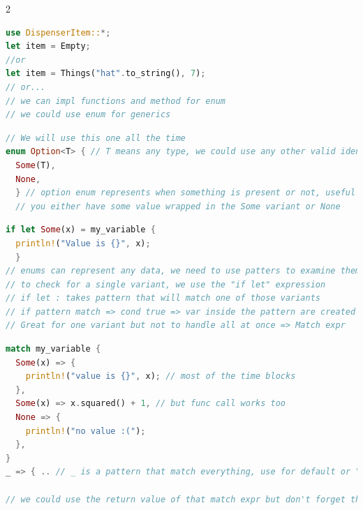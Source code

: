 \documentclass{report}
\begin{document}
\begin{multicols*}{2}
\begin{tcolorbox}[colback=backcolour,size=small,left=4mm]
\begin{lstlisting}[language=rust]
use DispenserItem::*;
let item = Empty;
//or 
let item = Things("hat".to_string(), 7);
// or...
// we can impl functions and method for enum
// we could use enum for generics
\end{lstlisting}
\end{tcolorbox}

\begin{tcolorbox}[title=Option Enum (Std),colback=backcolour,size=small,left=4mm]
\begin{lstlisting}[language=rust]
// We will use this one all the time
enum Option<T> { // T means any type, we could use any other valid identifier, but the idiomatic thing in rust is to use T or other CAP letter
  Some(T),
  None,
  } // option enum represents when something is present or not, useful when we want to reach of null or nil
  // you either have some value wrapped in the Some variant or None
\end{lstlisting}
\end{tcolorbox}

\begin{tcolorbox}[title=Examples,colback=backcolour,size=small,left=4mm]
\begin{lstlisting}[language=rust]
if let Some(x) = my_variable {
  println!("Value is {}", x);
  }
// enums can represent any data, we need to use patters to examine them
// to check for a single variant, we use the "if let" expression
// if let : takes pattern that will match one of those variants
// if pattern match => cond true => var inside the pattern are created
// Great for one variant but not to handle all at once => Match expr
\end{lstlisting}
\end{tcolorbox}

\begin{tcolorbox}[title=Match Expression,colback=backcolour,size=small,left=4mm]
\begin{lstlisting}[language=rust]
match my_variable {
  Some(x) => {
    println!("value is {}", x); // most of the time blocks
  },
  Some(x) => x.squared() + 1, // but func call works too
  None => {
    println!("no value :(");
  },
}
_ => { .. // _ is a pattern that match everything, use for default or "anything else" branch

// we could use the return value of that match expr but don't forget the ; at the end

\end{lstlisting}
\end{tcolorbox}


\end{multicols*}
\end{document}
